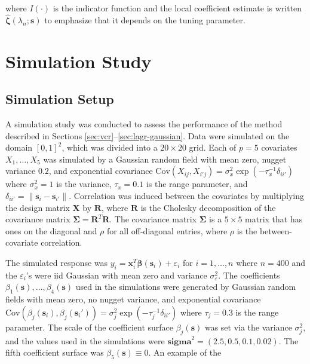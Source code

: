 \documentclass[authoryear,review, 12pt]{elsarticle}
\begin{document}
where $I\left(\cdot\right)$ is the indicator function and the local
coefficient estimate is written $\hat{\bm{\zeta}}(\lambda_{n};\bm{s})$
to emphasize that it depends on the tuning parameter.

\section{Simulation Study\label{sec:simulations}}

\subsection{Simulation Setup}

A simulation study was conducted to assess the performance of the
method described in Sections \ref{sec:vcr}--\ref{sec:lagr-gaussian}.
Data were simulated on the domain $[0,1]^{2}$, which was divided
into a $20\times20$ grid. Each of $p=5$ covariates $X_{1},\dots,X_{5}$
was simulated by a Gaussian random field with mean zero, nugget variance $0.2$, and exponential
covariance $\text{Cov}\left(X_{ij},X_{i'j}\right)=\sigma_{x}^{2}\exp\left(-\tau_{x}^{-1}\delta_{ii'}\right)$
where $\sigma_{x}^{2}=1$ is the variance, $\tau_{x}=0.1$ is the
range parameter, and $\delta_{ii'}=\|\bm{s}_{i}-\bm{s}_{i'}\|$. Correlation
was induced between the covariates by multiplying the design matrix
$\bm{X}$ by $\bm{R}$, where $\bm{R}$ is the Cholesky decomposition
of the covariance matrix $\bm{\Sigma}=\bm{R}^{T}\bm{R}$. The covariance
matrix $\bm{\Sigma}$ is a $5\times5$ matrix that has ones on the
diagonal and $\rho$ for all off-diagonal entries, where $\rho$ is
the between-covariate correlation. 

The simulated response was $y_{i}=\bm{x}_{i}^{T}\bm{\beta}(\bm{s}_{i})+\varepsilon_{i}$
for $i=1,\dots,n$ where $n=400$ and the $\varepsilon_{i}$'s were
iid Gaussian with mean zero and variance $\sigma_{\varepsilon}^{2}$.
The coefficients $\beta_1(\bm{s}), \dots, \beta_4(\bm{s})$ used in the simulations were generated by Gaussian random fields with mean zero, no nugget variance, and exponential
covariance $\text{Cov}\left(\beta_j(\bm{s}_i), \beta_j(\bm{s}_i')\right)=\sigma_j^2 \exp\left(-\tau_j^{-1}\delta_{ii'}\right)$
where $\tau_j=0.3$ is the range parameter. The scale of the coefficient surface $\beta_j(\bm{s})$ was set via the variance $\sigma_j^2$, and the values used in the simulations were $\bm{sigma}^2 = \left( 2.5, 0.5, 0.1, 0.02 \right)$.
The fifth coefficient surface was $\beta_5(\bm{s}) \equiv 0$. An example of the 
\end{document}
